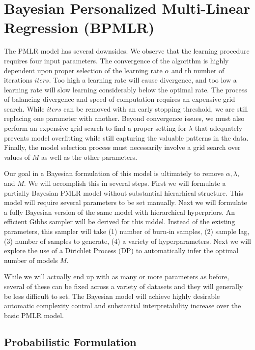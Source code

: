 \documentclass[10pt]{proc}
\begin{document}
\section{Bayesian Personalized Multi-Linear Regression (BPMLR)}

The PMLR model has several downsides. We observe that the learning
procedure requires four input parameters. The convergence of the algorithm is
highly dependent upon proper selection of the learning rate $\alpha$ and th
number of iterations $iters$. Too high a learning rate will cause divergence,
and too low a learning rate will slow learning considerably below the optimal
rate. The process of balancing divergence and speed of computation requires an
expensive grid search. While $iters$ can be removed with an early stopping
threshold, we are still replacing one parameter with another. Beyond convergence
issues, we must also perform an expensive grid search to find a proper setting
for $\lambda$ that adequately prevents model overfitting while still capturing
the valuable patterns in the data. Finally, the model selection process must
necessarily involve a grid search over values of $M$ as well as the other
parameters.

Our goal in a Bayesian formulation of this model is ultimately to remove
$\alpha, \lambda,$ and $M$. We will accomplish this in several steps. First we
will formulate a partially Bayesian PMLR model without substantial hierarhical
structure. This model will require several parameters to be set manually. Next
we will formulate a fully Bayesian version of the same model with hierarchical
hyperpriors. An efficient Gibbs sampler will be derived for this mddel. Instead
of the existing parameters, this sampler will take (1) number of burn-in
samples, (2) sample lag, (3) number of samples to generate, (4) a variety of
hyperparameters. Next we will explore the use of a Dirichlet Process (DP) to
automatically infer the optimal number of models $M$.

While we will actually end up with as many or more parameters as before, several
of these can be fixed across a variety of datasets and they will generally be
less difficult to set. The Bayesian model will achieve highly desirable
automatic complexity control and substantial interpretability increase over the
basic PMLR model.

\subsection{Probabilistic Formulation}
\end{document}

